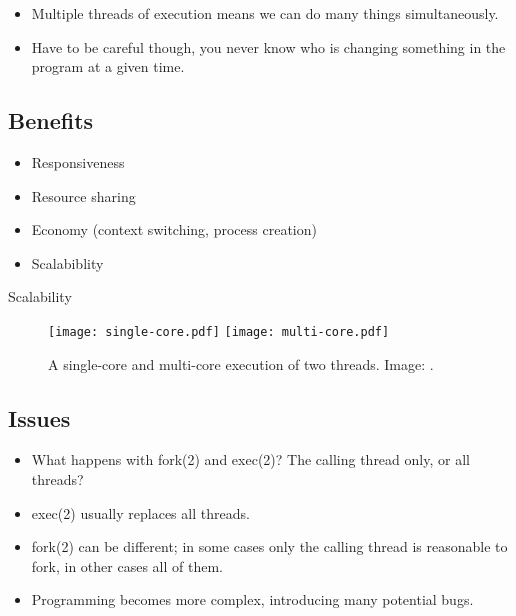 \documentclass{beamer}
\begin{document}
\begin{frame}{\insertsubsectionhead}
  \begin{itemize}
    \item Multiple threads of execution means we can do many things 
      simultaneously.

    \item Have to be careful though, you never know who is changing something 
      in the program at a given time.

  \end{itemize}
\end{frame}

\subsection{Benefits}

\begin{frame}{\insertsubsectionhead}
  \begin{itemize}
    \item Responsiveness
    \item Resource sharing
    \item Economy (context switching, process creation)
    \item Scalabiblity
  \end{itemize}
\end{frame}

\begin{frame}{\insertsubsectionhead}{Scalability}
  \begin{figure}
    \texttt{[image: single-core.pdf]}
    \hfill
    \texttt{[image: multi-core.pdf]}
    \caption{A single-core and multi-core execution of two threads.
      Image: \cite{Silberschatz2013osc}.}
  \end{figure}
\end{frame}

\subsection{Issues}

\begin{frame}{\insertsubsectionhead}
  \begin{itemize}
    \item What happens with fork(2) and exec(2)?
      The calling thread only, or all threads?

    \item exec(2) usually replaces all threads.

    \item fork(2) can be different; in some cases only the calling thread is 
      reasonable to fork, in other cases all of them.

    \item Programming becomes more complex, introducing many potential bugs.

  \end{itemize}
\end{frame}
\end{document}
